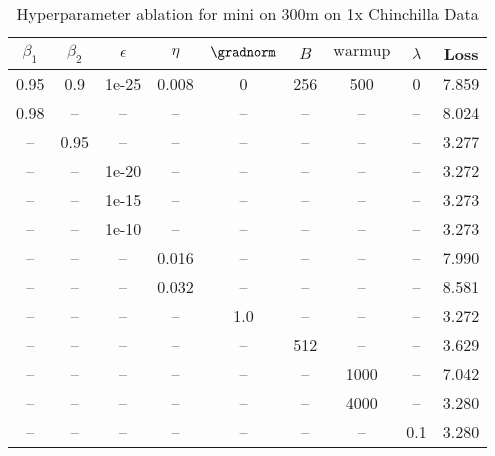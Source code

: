 \begin{table}[h!]
\centering
\caption{Hyperparameter ablation for mini on 300m on 1x Chinchilla Data}
\label{tab:ablation_mini_300m_on_1x_chinchilla_data}
\begin{tabular}{ccccccccc}
\toprule
$\beta_1$ & $\beta_2$ & $\epsilon$ & $\eta$ & $\gradnorm$ & $B$ & $\mathrm{warmup}$ & $\lambda$ & Loss \\
\midrule
0.95 & 0.9 & 1e-25 & 0.008 & 0 & 256 & 500 & 0 & 7.859 \\
\midrule
0.98 & -- & -- & -- & -- & -- & -- & -- & 8.024 \\
-- & 0.95 & -- & -- & -- & -- & -- & -- & 3.277 \\
-- & -- & 1e-20 & -- & -- & -- & -- & -- & 3.272 \\
-- & -- & 1e-15 & -- & -- & -- & -- & -- & 3.273 \\
-- & -- & 1e-10 & -- & -- & -- & -- & -- & 3.273 \\
-- & -- & -- & 0.016 & -- & -- & -- & -- & 7.990 \\
-- & -- & -- & 0.032 & -- & -- & -- & -- & 8.581 \\
-- & -- & -- & -- & 1.0 & -- & -- & -- & 3.272 \\
-- & -- & -- & -- & -- & 512 & -- & -- & 3.629 \\
-- & -- & -- & -- & -- & -- & 1000 & -- & 7.042 \\
-- & -- & -- & -- & -- & -- & 4000 & -- & 3.280 \\
-- & -- & -- & -- & -- & -- & -- & 0.1 & 3.280 \\
\bottomrule
\end{tabular}
\end{table}

